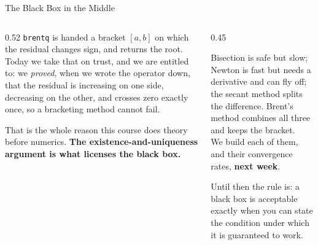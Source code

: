 \begin{frame}{The Black Box in the Middle}
\begin{columns}[T]
\begin{column}{0.52\textwidth}
\small
\texttt{brentq} is handed a bracket $[a,b]$ on which the residual changes sign, and returns the root. Today we take that on trust, and we are entitled to: we \emph{proved}, when we wrote the operator down, that the residual is increasing on one side, decreasing on the other, and crosses zero exactly once, so a bracketing method cannot fail.
\medskip

That is the whole reason this course does theory before numerics. \textbf{The existence-and-uniqueness argument is what licenses the black box.}
\end{column}
\begin{column}{0.45\textwidth}
\begin{cautionbox}[title=\textbf{What is inside it}]\footnotesize
Bisection is safe but slow; Newton is fast but needs a derivative and can fly off; the secant method splits the difference. Brent's method combines all three and keeps the bracket.\\[1mm]
We build each of them, and their convergence rates, \textbf{next week}.
\end{cautionbox}
\medskip
\begin{examplebox}\footnotesize
Until then the rule is: a black box is acceptable exactly when you can state the condition under which it is guaranteed to work.
\end{examplebox}
\end{column}
\end{columns}
\vspace{1mm}
\end{frame}

